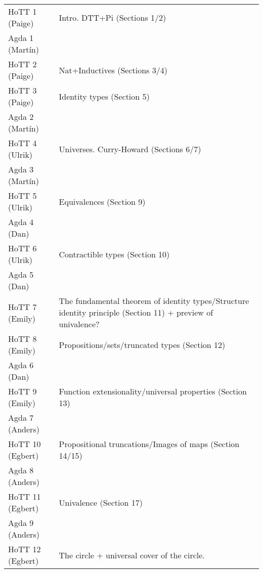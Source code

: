 \documentclass{article}
\begin{document}
\begin{center}
\begin{tabular}{lp{8.4cm}}
HoTT 1 (Paige)& Intro. DTT+Pi (Sections 1/2) \\

Agda 1 (Mart\'in)& \\

HoTT 2 (Paige)& Nat+Inductives (Sections 3/4) \\



HoTT 3 (Paige)& Identity types (Section 5) \\

Agda 2 (Mart\'in)& \\

HoTT 4 (Ulrik)&Universes. Curry-Howard (Sections 6/7) \\


Agda 3 (Mart\'in)& \\

HoTT 5 (Ulrik)& Equivalences (Section 9) \\

Agda 4 (Dan)& \\


HoTT 6 (Ulrik)& Contractible types (Section 10) \\

Agda 5 (Dan)& \\

HoTT 7 (Emily)& The fundamental theorem of identity types/Structure identity principle (Section 11) + preview of univalence? \\


HoTT 8 (Emily)& Propositions/sets/truncated types (Section 12) \\

Agda 6 (Dan)& \\

HoTT 9 (Emily)& Function extensionality/universal properties (Section 13)\\


Agda 7 (Anders)& \\

HoTT 10 (Egbert)& Propositional truncations/Images of maps (Section 14/15)\\

Agda 8 (Anders)& \\


HoTT 11 (Egbert) &  Univalence (Section 17)\\

Agda 9 (Anders) & \\

HoTT 12 (Egbert) & The circle + universal cover of the circle.

\end{tabular}
\end{center}
\end{document}
